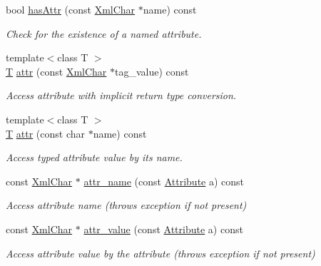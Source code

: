 \begin{DoxyCompactItemize}
bool \hyperlink{class_d_d4hep_1_1_x_m_l_1_1_element_a8572738778cedf06f789e0c602e75cef}{has\+Attr} (const \hyperlink{namespace_d_d4hep_1_1_x_m_l_a09e5d9cc86ed782f6826dfe0778c1815}{Xml\+Char} $\ast$name) const
\begin{DoxyCompactList}\small\item\em Check for the existence of a named attribute. \end{DoxyCompactList}\item 
{\footnotesize template$<$class T $>$ }\\\hyperlink{class_t}{T} \hyperlink{class_d_d4hep_1_1_x_m_l_1_1_element_a47e97b105b492796c37a8232bcee6e02}{attr} (const \hyperlink{namespace_d_d4hep_1_1_x_m_l_a09e5d9cc86ed782f6826dfe0778c1815}{Xml\+Char} $\ast$tag\+\_\+value) const
\begin{DoxyCompactList}\small\item\em Access attribute with implicit return type conversion. \end{DoxyCompactList}\item 
{\footnotesize template$<$class T $>$ }\\\hyperlink{class_t}{T} \hyperlink{class_d_d4hep_1_1_x_m_l_1_1_element_ae7ec20c820dab2ff2e1078813aba69ca}{attr} (const char $\ast$name) const
\begin{DoxyCompactList}\small\item\em Access typed attribute value by it\textquotesingle{}s name. \end{DoxyCompactList}\item 
const \hyperlink{namespace_d_d4hep_1_1_x_m_l_a09e5d9cc86ed782f6826dfe0778c1815}{Xml\+Char} $\ast$ \hyperlink{class_d_d4hep_1_1_x_m_l_1_1_element_abf6fd43ca3f42b7e924613a6fdb2ddf6}{attr\+\_\+name} (const \hyperlink{namespace_d_d4hep_1_1_x_m_l_a5c19b7116be99d69b4b22d911357baaf}{Attribute} a) const
\begin{DoxyCompactList}\small\item\em Access attribute name (throws exception if not present) \end{DoxyCompactList}\item 
const \hyperlink{namespace_d_d4hep_1_1_x_m_l_a09e5d9cc86ed782f6826dfe0778c1815}{Xml\+Char} $\ast$ \hyperlink{class_d_d4hep_1_1_x_m_l_1_1_element_a3a9a3379d22086608836995cf35c3243}{attr\+\_\+value} (const \hyperlink{namespace_d_d4hep_1_1_x_m_l_a5c19b7116be99d69b4b22d911357baaf}{Attribute} a) const
\begin{DoxyCompactList}\small\item\em Access attribute value by the attribute (throws exception if not present) \end{DoxyCompactList}\item 

\end{DoxyCompactItemize}
